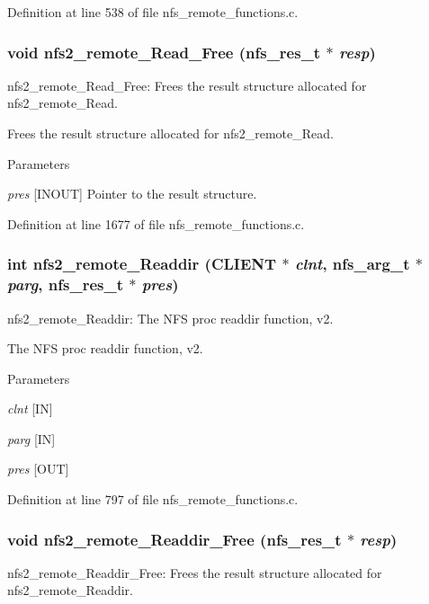 Definition at line 538 of file nfs\_\-remote\_\-functions.c.
\subsubsection[{nfs2\_\-remote\_\-Read\_\-Free}]{\setlength{\rightskip}{0pt plus 5cm}void nfs2\_\-remote\_\-Read\_\-Free (nfs\_\-res\_\-t $\ast$ {\em resp})}\label{group__NFSprocs_ga927c4395d0af8c46656f39f2be8d9152}
nfs2\_\-remote\_\-Read\_\-Free: Frees the result structure allocated for nfs2\_\-remote\_\-Read.

Frees the result structure allocated for nfs2\_\-remote\_\-Read.


\begin{DoxyParams}{Parameters}
\item[{\em pres}][INOUT] Pointer to the result structure. \end{DoxyParams}


Definition at line 1677 of file nfs\_\-remote\_\-functions.c.
\subsubsection[{nfs2\_\-remote\_\-Readdir}]{\setlength{\rightskip}{0pt plus 5cm}int nfs2\_\-remote\_\-Readdir (CLIENT $\ast$ {\em clnt}, \/  nfs\_\-arg\_\-t $\ast$ {\em parg}, \/  nfs\_\-res\_\-t $\ast$ {\em pres})}\label{group__NFSprocs_ga8f704898b265261eeeef2d62957bb2d8}
nfs2\_\-remote\_\-Readdir: The NFS proc readdir function, v2.

The NFS proc readdir function, v2.


\begin{DoxyParams}{Parameters}
\item[{\em clnt}][IN] \item[{\em parg}][IN] \item[{\em pres}][OUT] \end{DoxyParams}


Definition at line 797 of file nfs\_\-remote\_\-functions.c.
\subsubsection[{nfs2\_\-remote\_\-Readdir\_\-Free}]{\setlength{\rightskip}{0pt plus 5cm}void nfs2\_\-remote\_\-Readdir\_\-Free (nfs\_\-res\_\-t $\ast$ {\em resp})}\label{group__NFSprocs_gad4cf54990950404722b215986f68703f}
nfs2\_\-remote\_\-Readdir\_\-Free: Frees the result structure allocated for nfs2\_\-remote\_\-Readdir.

